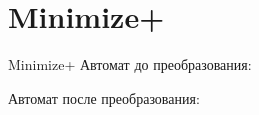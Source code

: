 \section{Minimize+}
\begin{frame}{Minimize+}
	Автомат до преобразования:


	Автомат после преобразования:


\end{frame}
